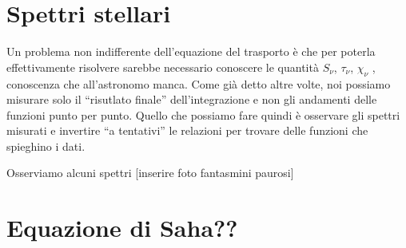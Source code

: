\section{Spettri stellari}
    Un problema non indifferente dell'equazione del trasporto è che per poterla effettivamente risolvere sarebbe necessario conoscere le quantità $S_\nu$, $\tau_\nu$, $\chi_\nu$ \myetc, conoscenza che all'astronomo manca. Come già detto altre volte, noi possiamo misurare solo il ``risutlato finale'' dell'integrazione e non gli andamenti delle funzioni punto per punto. Quello che possiamo fare quindi è osservare gli spettri misurati e invertire ``a tentativi'' le relazioni per trovare delle funzioni che spieghino i dati.

    Osserviamo alcuni spettri [inserire foto fantasmini paurosi]
    

\section{Equazione di Saha??}